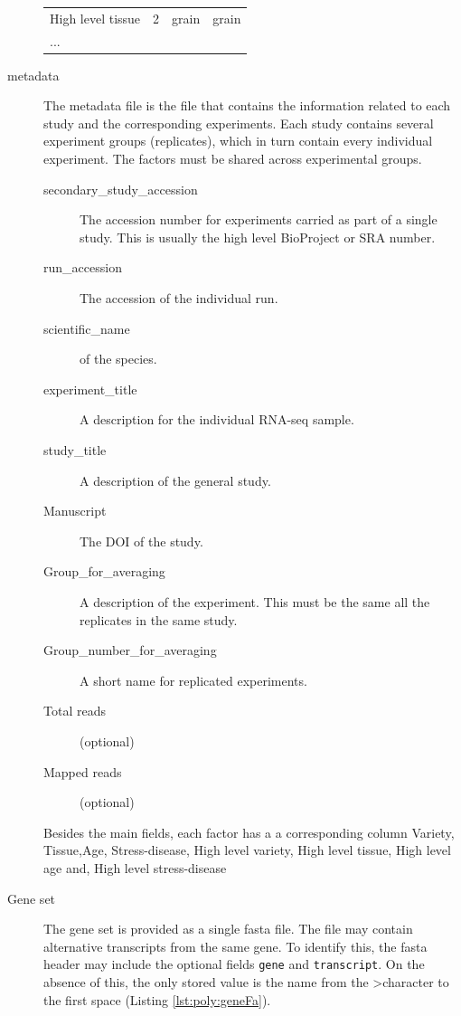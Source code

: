 \begin{description}
\begin{table}
\begin{tabular}{llll}
High level tissue & 2 & grain & grain \\
... & & \\
\bottomrule
\end{tabular}
\end{table}
\item[metadata] The metadata file is the file that contains the information related to each study and the corresponding experiments. 
Each study contains several experiment groups (replicates), which in turn contain every individual experiment. 
The factors must be shared across experimental groups. 
\begin{description}
\item[secondary\_study\_accession] The accession number for experiments carried as part of a single study. This is usually the high level BioProject or SRA number. 
\item[run\_accession] The accession of the individual run. 
\item[scientific\_name] of the species. 
\item[experiment\_title] A description for the individual RNA-seq sample.
\item[study\_title] A description of the general study.
\item[Manuscript] The DOI of the study.
\item[Group\_for\_averaging] A description of the experiment. This must be the same all the replicates in the same study. 
\item[Group\_number\_for\_averaging] A short name for replicated experiments.  
\item[Total reads] (optional)
\item[Mapped reads] (optional)
\end{description}
Besides the main fields, each factor has a a corresponding column Variety, Tissue,Age, Stress-disease, High level variety, High level tissue, High level age and, High level stress-disease

\item[Gene set] The gene set is provided as a single fasta file. 
The file may contain alternative transcripts from the same gene. To identify this, the fasta header may include the optional fields \texttt{gene} and \texttt{transcript}. 
On the absence of this, the only stored value is the name from the \textgreater  character to the first space (Listing \ref{lst:poly:geneFa}). 


\end{description}
